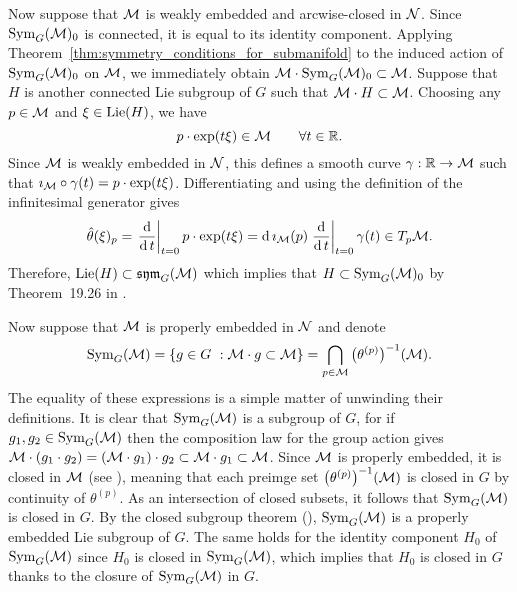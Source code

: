 \documentclass[twoside,11pt]{article}
\begin{document}
    Now suppose that ${\mathcal{M}}$ is weakly embedded and arcwise-closed in ${\mathcal{N}}$.
    Since $\operatorname{Sym}_G({\mathcal{M}})_0$ is connected, it is equal to its identity component.
    Applying Theorem~\ref{thm:symmetry_conditions_for_submanifold} to the induced action of $\operatorname{Sym}_G({\mathcal{M}})_0$ on ${\mathcal{M}}$, we immediately obtain ${\mathcal{M}} \cdot \operatorname{Sym}_G({\mathcal{M}})_0 \subset {\mathcal{M}}$.
    Suppose that $H$ is another connected Lie subgroup of $G$ such that ${\mathcal{M}}\cdot H \subset {\mathcal{M}}$.
    Choosing any $p\in{\mathcal{M}}$ and $\xi \in \operatorname{Lie}(H)$, we have
    \begin{equation}
        p \cdot \exp(t\xi) \in {\mathcal{M}} \qquad \forall t\in \mathbb{R}.
    \end{equation}
    Since ${\mathcal{M}}$ is weakly embedded in ${\mathcal{N}}$, this defines a smooth curve $\gamma: \mathbb{R} \to {\mathcal{M}}$ such that $\imath_{{\mathcal{M}}} \circ \gamma(t) = p \cdot \exp(t\xi)$.
    Differentiating and using the definition of the infinitesimal generator gives
    \begin{equation}
        \hat{\theta}(\xi)_p = \left.\frac{\operatorname{\mathrm{d}}}{\operatorname{\mathrm{d}} t}\right\vert_{t=0} p \cdot \exp(t\xi) = \operatorname{\mathrm{d}} \imath_{{\mathcal{M}}}(p) \left.\frac{\operatorname{\mathrm{d}}}{\operatorname{\mathrm{d}} t}\right\vert_{t=0} \gamma(t) \in T_p {\mathcal{M}}.
    \end{equation}
    Therefore, $\operatorname{Lie}(H) \subset \operatorname{\mathfrak{sym}}_G({\mathcal{M}})$ which implies that $H \subset \operatorname{Sym}_G({\mathcal{M}})_0$ by Theorem~19.26 in \cite{Lee2013introduction}.

    Now suppose that ${\mathcal{M}}$ is properly embedded in ${\mathcal{N}}$ and denote
    \begin{equation}
        \operatorname{Sym}_G({\mathcal{M}}) 
        = \{ g\in G \ : {\mathcal{M}} \cdot g \subset {\mathcal{M}} \}
        = \bigcap_{p\in{\mathcal{M}}} \big(\theta^{(p)}\big)^{-1}({\mathcal{M}}).
    \end{equation}
    The equality of these expressions is a simple matter of unwinding their definitions.
    It is clear that $\operatorname{Sym}_G({\mathcal{M}})$ is a subgroup of $G$, for if $g_1, g_2 \in \operatorname{Sym}_G({\mathcal{M}})$ then the composition law for the group action gives ${\mathcal{M}} \cdot (g_1\cdot g_2) = ({\mathcal{M}} \cdot g_1) \cdot g_2 \subset {\mathcal{M}} \cdot g_1 \subset {\mathcal{M}}$.
    Since ${\mathcal{M}}$ is properly embedded, it is closed in ${\mathcal{M}}$ (see \citet[Proposition~5.5]{Lee2013introduction}), meaning that each preimge set $\big(\theta^{(p)}\big)^{-1}({\mathcal{M}})$ is closed in $G$ by continuity of $\theta^{(p)}$.
    As an intersection of closed subsets, it follows that $\operatorname{Sym}_G({\mathcal{M}})$ is closed in $G$.
    By the closed subgroup theorem (\citet[Theorem~20.12]{Lee2013introduction}), $\operatorname{Sym}_G({\mathcal{M}})$ is a properly embedded Lie subgroup of $G$.
    The same holds for the identity component $H_0$ of $\operatorname{Sym}_G({\mathcal{M}})$ since $H_0$ is closed in $\operatorname{Sym}_G({\mathcal{M}})$, which implies that $H_0$ is closed in $G$ thanks to the closure of $\operatorname{Sym}_G({\mathcal{M}})$ in $G$.
    
\end{document}
